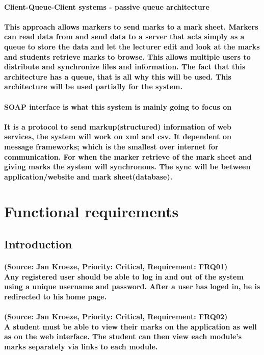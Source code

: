 \documentclass[12pt]{article}
\begin{document}
\paragraph{Client-Queue-Client systems - passive queue architecture}
\paragraph{This approach allows markers to send marks to a mark sheet. Markers can read data from and send data to a server that acts simply as a queue to store the data and let the lecturer edit and look at the marks and students retrieve marks to browse. This allows multiple users to distribute and synchronize files and information. The fact that this architecture has a queue, that is all why this will be used. This architecture will be used partially for the system. 
}
\paragraph{SOAP interface is what this system is mainly going to focus on }
\paragraph{It is a protocol to send markup(structured) information of web services, the system will work on xml and csv. It dependent on message frameworks; which is the smallest over internet for communication. For when the marker retrieve of the mark sheet and giving marks the system will synchronous. The sync will be between application/website and mark sheet(database).
}
  \section{Functional requirements}
  \subsection{Introduction}
  \paragraph{(Source: Jan Kroeze, Priority: Critical, Requirement: FRQ01) \\
  Any registered user should be able to log in and out of the system using a unique username and password. After a user has loged in, he is redirected to his home page.}
  \paragraph{(Source: Jan Kroeze, Priority: Critical, Requirement: FRQ02) \\
  A student must be able to view their marks on the application as well as on  the web interface. The student can then view each module's marks separately via links to each module. }
\end{document}
